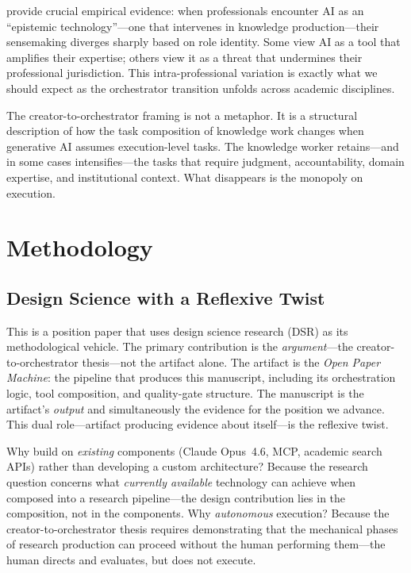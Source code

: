 \documentclass{article}
\begin{document}
\citet{scarbrough2024epistemic} provide crucial empirical evidence: when professionals encounter AI as an ``epistemic technology''---one that intervenes in knowledge production---their sensemaking diverges sharply based on role identity. Some view AI as a tool that amplifies their expertise; others view it as a threat that undermines their professional jurisdiction. This intra-professional variation is exactly what we should expect as the orchestrator transition unfolds across academic disciplines.

The creator-to-orchestrator framing is not a metaphor. It is a structural description of how the task composition of knowledge work changes when generative AI assumes execution-level tasks. The knowledge worker retains---and in some cases intensifies---the tasks that require judgment, accountability, domain expertise, and institutional context. What disappears is the monopoly on execution.

\section{Methodology}
\label{sec:method}

\subsection{Design Science with a Reflexive Twist}

This is a position paper that uses design science research (DSR) \citep{hevner2004design} as its methodological vehicle. The primary contribution is the \textit{argument}---the creator-to-orchestrator thesis---not the artifact alone. The artifact is the \textit{Open Paper Machine}: the pipeline that produces this manuscript, including its orchestration logic, tool composition, and quality-gate structure. The manuscript is the artifact's \textit{output} and simultaneously the evidence for the position we advance. This dual role---artifact producing evidence about itself---is the reflexive twist.

Why build on \textit{existing} components (Claude Opus~4.6, MCP, academic search APIs) rather than developing a custom architecture? Because the research question concerns what \textit{currently available} technology can achieve when composed into a research pipeline---the design contribution lies in the composition, not in the components. Why \textit{autonomous} execution? Because the creator-to-orchestrator thesis requires demonstrating that the mechanical phases of research production can proceed without the human performing them---the human directs and evaluates, but does not execute.
\end{document}
